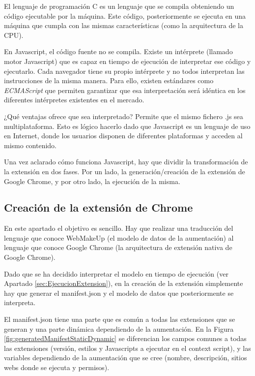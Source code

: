 El lenguaje de programación C es un lenguaje que se compila obteniendo un código ejecutable por la máquina. Este código, posteriormente se ejecuta en una máquina que cumpla con las mismas características (como la arquitectura de la CPU).

En Javascript, el código fuente no se compila. Existe un intérprete (llamado motor Javascript) que es capaz en tiempo de ejecución de interpretar ese código y ejecutarlo. Cada navegador tiene su propio intérprete y no todos interpretan las instrucciones de la misma manera. Para ello, existen estándares como \emph{ECMAScript} que permiten garantizar que esa interpretación será idéntica en los diferentes intérpretes existentes en el mercado.

¿Qué ventajas ofrece que sea interpretado? Permite que el mismo fichero .js sea multiplataforma. Esto es lógico hacerlo dado que Javascript es un lenguaje de uso en Internet, donde los usuarios disponen de diferentes plataformas y acceden al mismo contenido.

Una vez aclarado cómo funciona Javascript, hay que dividir la transformación de la extensión en dos fases. Por un lado, la generación/creación de la extensión de Google Chrome, y por otro lado, la ejecución de la misma.

\subsection{Creación de la extensión de Chrome}
\label{sec:CreacionExtension}

En este apartado el objetivo es sencillo. Hay que realizar una traducción del lenguaje que conoce WebMakeUp (el modelo de datos de la aumentación) al lenguaje que conoce Google Chrome (la arquitectura de extensión nativa de Google Chrome).

Dado que se ha decidido interpretar el modelo en tiempo de ejecución (ver Apartado \ref{sec:EjecucionExtension}), en la creación de la extensión simplemente hay que generar el manifest.json y el modelo de datos que posteriormente se interpreta.

El manifest.json tiene una parte que es común a todas las extensiones que se generan y una parte dinámica dependiendo de la aumentación. En la Figura \ref{fig:generatedManifestStaticDynamic} se diferencian los campos comunes a todas las extensiones (versión, estilos y Javascripts a ejecutar en el context script), y las variables dependiendo de la aumentación que se cree (nombre, descripción, sitios webs donde se ejecuta y permisos).

